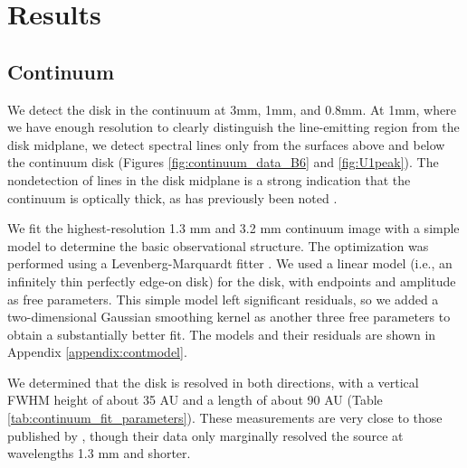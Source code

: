 \documentclass[twocolumn]{aastex61}
\newcommand{\sourcei}{SrcI\xspace}
\begin{document}


\section{Results}
\label{sec:results}

\subsection{Continuum}
We detect the disk in the continuum at 3mm, 1mm, and 0.8mm.  At 1mm, where we
have enough resolution to clearly distinguish the line-emitting region from the
disk midplane, we detect spectral lines only from the surfaces above and below the
continuum disk (Figures \ref{fig:continuum_data_B6} and \ref{fig:U1peak}).
The nondetection of lines in the disk midplane is a strong indication that the
continuum is optically thick, as has previously been noted
\citep[e.g.,][]{Plambeck2016a}.


We fit the highest-resolution 1.3 mm and 3.2 mm continuum image with a simple
model to determine the basic
observational structure.
The optimization was performed using a Levenberg-Marquardt
fitter \citep{Newville2014a}. 
We used a linear model (i.e., an infinitely thin
perfectly edge-on disk) for the disk, with endpoints and amplitude as free parameters.
This simple model left significant residuals, so we added a two-dimensional
Gaussian smoothing kernel as another three free parameters to obtain a
substantially better fit.
The models and their residuals
are shown in Appendix \ref{appendix:contmodel}.

We determined that the disk is resolved in both
directions, with a vertical FWHM height of about 35 AU and a length of about
90 AU (Table \ref{tab:continuum_fit_parameters}).  These measurements
are very close to those published by \citet{Plambeck2016a}, though their data
only marginally resolved the source at wavelengths 1.3 mm and shorter.
\end{document}
